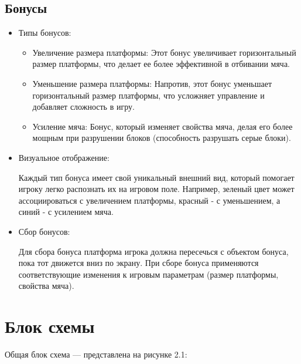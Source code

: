 \subsection{\label{subsec:ch02/sec02/sub05}Бонусы}
\begin{itemize}

    \item Типы бонусов:
    \begin{itemize}
        
        \item Увеличение размера платформы: Этот бонус увеличивает горизонтальный размер платформы, что делает ее более эффективной в отбивании мяча.
        \item Уменьшение размера платформы: Напротив, этот бонус уменьшает горизонтальный размер платформы, что усложняет управление и добавляет сложность в игру.
        \item Усиление мяча: Бонус, который изменяет свойства мяча, делая его более мощным при разрушении блоков (способность разрушать серые блоки).
\end{itemize}        
    \item Визуальное отображение:
    
        Каждый тип бонуса имеет свой уникальный внешний вид, который помогает игроку легко распознать их на игровом поле. Например, зеленый цвет может ассоциироваться с увеличением платформы, красный - с уменьшением, а синий - с усилением мяча.

    \item Сбор бонусов:
    
        Для сбора бонуса платформа игрока должна пересечься с объектом бонуса, пока тот движется вниз по экрану.
        При сборе бонуса применяются соответствующие изменения к игровым параметрам (размер платформы, свойства мяча).
        
\end{itemize}

\section{\label{sec:ch02/sec03}Блок схемы}
Общая блок схема — представлена на рисунке 2.1: 

